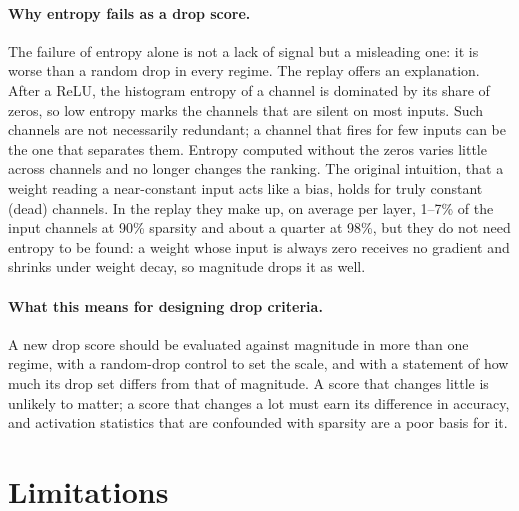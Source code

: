 \paragraph{Why entropy fails as a drop score.} The failure of entropy alone is not a lack of signal but a misleading one: it is worse than a random drop in every regime. The replay offers an explanation. After a ReLU, the histogram entropy of a channel is dominated by its share of zeros, so low entropy marks the channels that are silent on most inputs. Such channels are not necessarily redundant; a channel that fires for few inputs can be the one that separates them. Entropy computed without the zeros varies little across channels and no longer changes the ranking. The original intuition, that a weight reading a near-constant input acts like a bias, holds for truly constant (dead) channels. In the replay they make up, on average per layer, 1--7\% of the input channels at 90\% sparsity and about a quarter at 98\%, but they do not need entropy to be found: a weight whose input is always zero receives no gradient and shrinks under weight decay, so magnitude drops it as well.

\paragraph{What this means for designing drop criteria.} A new drop score should be evaluated against magnitude in more than one regime, with a random-drop control to set the scale, and with a statement of how much its drop set differs from that of magnitude. A score that changes little is unlikely to matter; a score that changes a lot must earn its difference in accuracy, and activation statistics that are confounded with sparsity are a poor basis for it.

\section{Limitations}
\label{sec:limitations}

